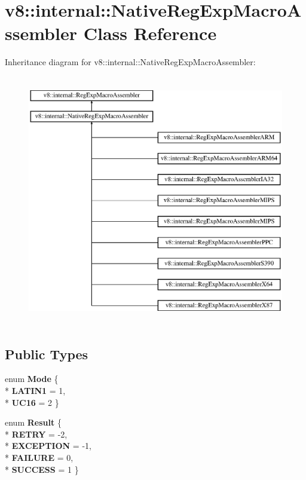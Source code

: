 \hypertarget{classv8_1_1internal_1_1_native_reg_exp_macro_assembler}{}\section{v8\+:\+:internal\+:\+:Native\+Reg\+Exp\+Macro\+Assembler Class Reference}
\label{classv8_1_1internal_1_1_native_reg_exp_macro_assembler}
Inheritance diagram for v8\+:\+:internal\+:\+:Native\+Reg\+Exp\+Macro\+Assembler\+:\begin{figure}[H]
\begin{center}
\leavevmode
\includegraphics[height=11.000000cm]{classv8_1_1internal_1_1_native_reg_exp_macro_assembler}
\end{center}
\end{figure}
\subsection*{Public Types}
\begin{DoxyCompactItemize}
\item 
enum {\bfseries Mode} \{ \\*
{\bfseries L\+A\+T\+I\+N1} = 1, 
\\*
{\bfseries U\+C16} = 2
 \}\hypertarget{classv8_1_1internal_1_1_native_reg_exp_macro_assembler_a0d5534efccb56e5c02e89be0081f406a}{}\label{classv8_1_1internal_1_1_native_reg_exp_macro_assembler_a0d5534efccb56e5c02e89be0081f406a}

\item 
enum {\bfseries Result} \{ \\*
{\bfseries R\+E\+T\+RY} = -\/2, 
\\*
{\bfseries E\+X\+C\+E\+P\+T\+I\+ON} = -\/1, 
\\*
{\bfseries F\+A\+I\+L\+U\+RE} = 0, 
\\*
{\bfseries S\+U\+C\+C\+E\+SS} = 1
 \}\hypertarget{classv8_1_1internal_1_1_native_reg_exp_macro_assembler_a454f330d24fa368c4ea0ff628f1d28f1}{}\label{classv8_1_1internal_1_1_native_reg_exp_macro_assembler_a454f330d24fa368c4ea0ff628f1d28f1}

\end{DoxyCompactItemize}
